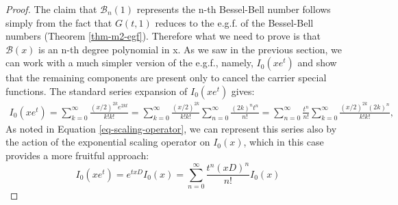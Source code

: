 \documentclass[a4paper]{amsart}
\begin{document}
\begin{proof}
The claim that $\mathscr{B}_n(1)$ represents the n-th Bessel-Bell number follows simply from the fact that $G(t,1)$ reduces to the e.g.f. of the Bessel-Bell numbers (Theorem \ref{thm-m2-egf}). Therefore what we need to prove is that $\mathscr{B}(x)$ is an n-th degree polynomial in x. As we saw in the previous section, we can work with a much simpler version of the e.g.f., namely, $I_0(xe^t)$ and show that the remaining components are present only to cancel the carrier special functions. The standard series expansion of $I_0(xe^t)$ gives:
\[
\begin{aligned}
I_0(x e^t) = \sum_{k=0}^\infty \frac{(x/2)^{2k} e^{2kt}}{k!k!} = \sum_{k=0}^\infty \frac{(x/2)^{2k}}{k!k!} \sum_{n=0}^\infty \frac{(2k)^n t^n}{n!} = \sum_{n=0}^\infty \frac{t^n}{n!} \sum_{k=0}^\infty \frac{(x/2)^{2k}(2k)^n}{k!k!},
\end{aligned}
\]
As noted in Equation \eqref{eq-scaling-operator}, we can represent this series also by the action of the exponential scaling operator on $I_0(x)$, which in this case provides a more fruitful approach:
\begin{equation}
   I_0(x e^t)= e^{txD}I_0(x)= \sum_{n=0}^{\infty}\frac{t^n(xD)^n}{n!}I_0(x)
\end{equation}


\end{proof}
\end{document}
